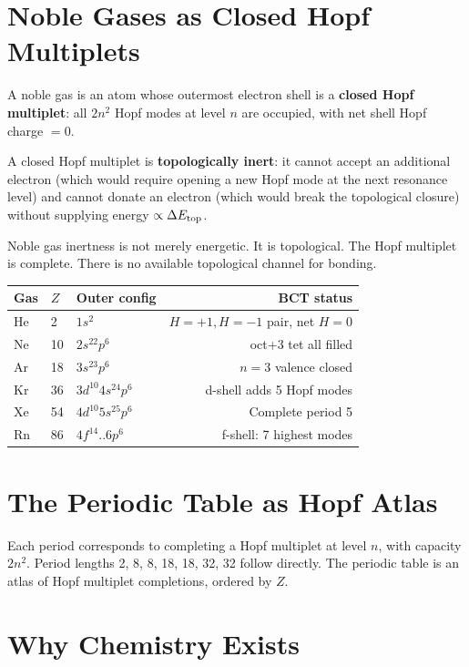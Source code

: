 \documentclass[aps,prl,twocolumn,showpacs,superscriptaddress]{revtex4-2}
\begin{document}
\section{Noble Gases as Closed Hopf Multiplets}

\begin{theorem}
A noble gas is an atom whose outermost electron shell is a \textbf{closed 
Hopf multiplet}: all $2n^2$ Hopf modes at level $n$ are occupied, 
with net shell Hopf charge $= 0$.

A closed Hopf multiplet is \textbf{topologically inert}: it cannot 
accept an additional electron (which would require opening a new Hopf 
mode at the next resonance level) and cannot donate an electron 
(which would break the topological closure) without supplying 
energy $\propto \Delta E_{\rm top}$.
\end{theorem}

Noble gas inertness is not merely energetic. It is topological. 
The Hopf multiplet is complete. There is no available topological 
channel for bonding.

\begin{center}
\begin{tabular}{lllr}
\toprule
Gas & $Z$ & Outer config & BCT status \\
\midrule
He & 2 & $1s^2$ & $H{=}+1,H{=}-1$ pair, net $H{=}0$ \\
Ne & 10 & $2s^22p^6$ & oct+3 tet all filled \\
Ar & 18 & $3s^23p^6$ & $n=3$ valence closed \\
Kr & 36 & $3d^{10}4s^24p^6$ & d-shell adds 5 Hopf modes \\
Xe & 54 & $4d^{10}5s^25p^6$ & Complete period 5 \\
Rn & 86 & $4f^{14}..6p^6$ & f-shell: 7 highest modes \\
\bottomrule
\end{tabular}
\end{center}

\section{The Periodic Table as Hopf Atlas}

Each period corresponds to completing a Hopf multiplet at level $n$, 
with capacity $2n^2$. Period lengths 2, 8, 8, 18, 18, 32, 32 
follow directly. The periodic table is an atlas of Hopf multiplet 
completions, ordered by $Z$.

\section{Why Chemistry Exists}
\end{document}
